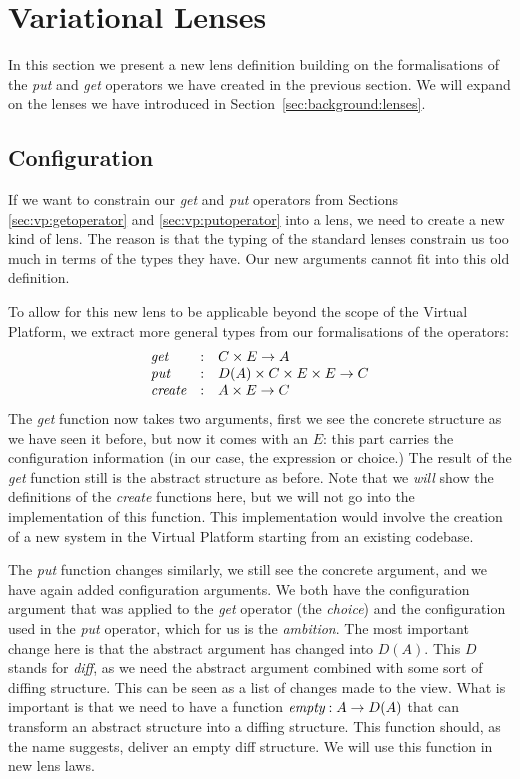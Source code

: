\chapter{Variational Lenses}\label{sec:configlenses}
In this section we present a new lens definition building on the formalisations 
of the \emph{put} and \emph{get} operators we have created in the previous
section. We will expand on the lenses we have introduced in Section~\ref{sec:background:lenses}.

\section{Configuration}
If we want to constrain our \emph{get} and \emph{put} operators from
Sections \ref{sec:vp:getoperator} and \ref{sec:vp:putoperator} into a lens, we
need to create a new kind of lens. The reason is that the typing of the
standard lenses constrain us too much in terms of the types they have. Our
new arguments cannot fit into this old definition.

To allow for this new lens to be applicable beyond the scope of the Virtual
Platform, we extract more general types from our formalisations of the
operators:
\[
  \begin{array}{lll}
    \textit{get} & : & C \times E \rightarrow A \\
    \textit{put} & : & D(A) \times C \times E \times E \rightarrow C \\
    \textit{create} & : & A \times E \rightarrow C
  \end{array}
\]
The \emph{get} function now takes two arguments, first we see the concrete
structure as we have seen it before, but now it comes with an \(E\): this part
carries the configuration information (in our case, the expression or choice.)
The result of the \emph{get} function still is the abstract structure as before. Note
that we \emph{will} show the definitions of the \emph{create} functions here, 
but we will not go into the implementation of this function. This implementation
would involve the creation of a new system in the Virtual Platform starting from an
existing codebase.

The \emph{put} function changes similarly, we still see the concrete
argument, and we have again added configuration arguments. We both have the 
configuration argument that was applied to the \emph{get} operator (the
\emph{choice}) and the configuration used in the \emph{put} operator, which for
us is the \emph{ambition}. The most important change here is that the abstract
argument has changed into \(D(A)\). This \(D\) stands for \emph{diff}, as we
need the abstract argument combined with some sort of diffing structure. This
can be seen as a list of changes made to the view. What
is important is that we need to have a function
\(\textit{empty} : A \rightarrow D(A)\) that can transform an abstract
structure into a diffing structure. This function should, as the name suggests,
deliver an empty diff structure. We will use this function in new lens laws.

